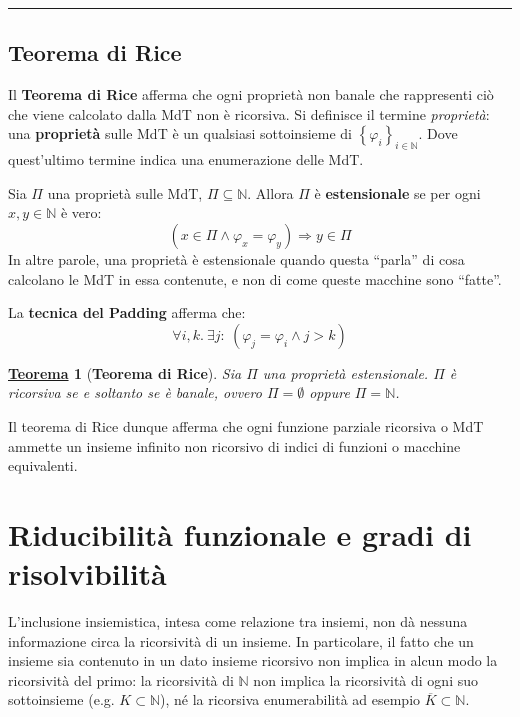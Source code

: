\documentclass[a4paper]{article}
\newtheorem{theorem}{\textcolor{Red3}{\underline{Teorema}}}
\newcommand{\dquotes}[1]{``#1''}
\newcommand{\longline}{\noindent\rule{\textwidth}{0.4pt}}
\begin{document}
	\longline

	\subsection{Teorema di Rice}
	
	Il \textcolor{Red3}{\textbf{Teorema di Rice}} afferma che ogni proprietà non banale che rappresenti ciò che viene calcolato dalla MdT non è ricorsiva. Si definisce il termine \emph{proprietà}: una \textcolor{Red3}{\textbf{proprietà}} sulle MdT è un qualsiasi sottoinsieme di $\left\{\varphi_{i}\right\}_{i \in \mathbb{N}}$. Dove quest'ultimo termine indica una enumerazione delle MdT.\newline
	
	\noindent
	Sia $\Pi$ una proprietà sulle MdT, $\Pi\subseteq\mathbb{N}$. Allora $\Pi$ è \textcolor{Red3}{\textbf{estensionale}} se per ogni $x, y \in \mathbb{N}$ è vero:
	\begin{equation*}
		\left(x \in \Pi \land \varphi_{x} = \varphi_{y}\right) \Longrightarrow y \in \Pi
	\end{equation*}
	In altre parole, una proprietà è estensionale quando questa \dquotes{parla} di cosa calcolano le MdT in essa contenute, e non di come queste macchine sono \dquotes{fatte}.\newline
	
	\noindent
	La \textbf{tecnica del Padding} afferma che:
	\begin{equation*}
		\forall i, k. \: \exists j: \:\left(\varphi_{j} = \varphi_{i} \land j > k\right)
	\end{equation*}
	\begin{theorem}[\textbf{Teorema di Rice}]
		Sia $\Pi$ una proprietà estensionale. $\Pi$ è ricorsiva se e soltanto se è banale, ovvero $\Pi = \emptyset$ oppure $\Pi = \mathbb{N}$.
	\end{theorem}
	\noindent
	Il teorema di Rice dunque afferma che ogni funzione parziale ricorsiva o MdT ammette un insieme infinito non ricorsivo di indici di funzioni o macchine equivalenti.\newpage
	
	\section{Riducibilità funzionale e gradi di risolvibilità}
	
	L'inclusione insiemistica, intesa come relazione tra insiemi, non dà nessuna informazione circa la ricorsività di un insieme. In particolare, il fatto che un insieme sia contenuto in un dato insieme ricorsivo non implica in alcun modo la ricorsività del primo: la ricorsività di $\mathbb{N}$ non implica la ricorsività di ogni suo sottoinsieme (e.g. $K \subset \mathbb{N}$), né la ricorsiva enumerabilità ad esempio $\overline{K} \subset \mathbb{N}$.
	
\end{document}

